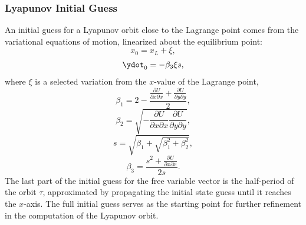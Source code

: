 \subsubsection{Lyapunov Initial Guess}
An initial guess for a Lyapunov orbit close to the Lagrange point comes from the variational
equations of motion, linearized about the equilibrium point:
\begin{equation}
    x_{0}=x_{L}+\xi,
    \label{eq:xvar}
\end{equation}
\begin{equation}
    \ydot_{0}=-\beta_{3}\xi s,
    \label{eq:ydotvar}
\end{equation}
where $\xi$ is a selected variation from the $x$-value of the Lagrange point,
\begin{equation}
    \beta_{1}=2-\frac{\frac{\partial U}{\partial x\partial x}+\frac{\partial U}{\partial y\partial y}}{2},
    \label{eq:beta1}
\end{equation}
\vspace{1mm}
\begin{equation}
    \beta_{2}=\sqrt{-\frac{\partial U}{\partial x\partial x}\frac{\partial U}{\partial y\partial y}},
    \label{eq:beta2}
\end{equation}
\vspace{1mm}
\begin{equation}
    s=\sqrt{\beta_{1}+\sqrt{\beta_{1}^{2}+\beta_{2}^{2}}},
    \label{eq:s}
\end{equation}
\vspace{1mm}
\begin{equation}
    \beta_{3}=\frac{s^{2}+\frac{\partial U}{\partial x\partial x}}{2s}.
    \label{eq:beta3}
\end{equation}
The last part of the initial guess for the free variable vector is the half-period of the orbit
$\tau$, approximated by propagating the initial state guess until it reaches the $x$-axis. The full
initial guess serves as the starting point for further refinement in the computation of the
Lyapunov orbit.


